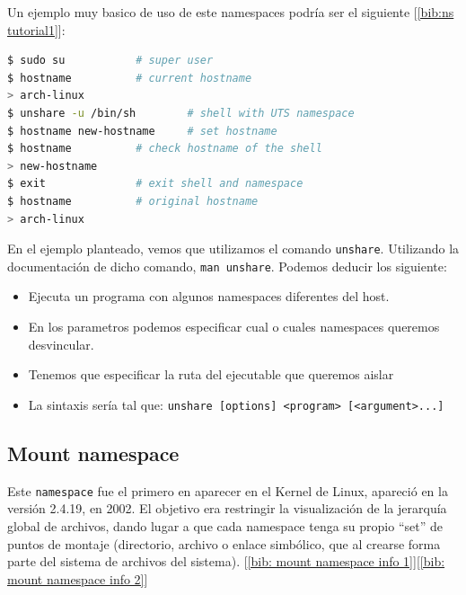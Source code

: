 \documentclass[12pt]{article}
\begin{document}
	\par \noindent Un ejemplo muy basico de uso de este namespaces podría ser el siguiente [\ref{bib:ns tutorial1}]:\\
	\begin{lstlisting}[language=bash, caption=Ejemplo de uso de UTS namespace]
$ sudo su			# super user
$ hostname			# current hostname
> arch-linux					
$ unshare -u /bin/sh		# shell with UTS namespace
$ hostname new-hostname		# set hostname
$ hostname			# check hostname of the shell
> new-hostname
$ exit				# exit shell and namespace
$ hostname			# original hostname
> arch-linux
	\end{lstlisting}

	\addvspace{10px}

	\par \noindent En el ejemplo planteado, vemos que utilizamos el comando \texttt{unshare}. Utilizando la documentación de dicho comando, \texttt{man unshare}. Podemos deducir los siguiente:
	\begin{itemize}
		\item Ejecuta un programa con algunos namespaces diferentes del host.
		\item En los parametros podemos especificar cual o cuales namespaces queremos desvincular.
		\item Tenemos que especificar la ruta del ejecutable que queremos aislar
		\item La sintaxis sería tal que: \texttt{unshare [options] <program> [<argument>...]}
	\end{itemize}
	
	\pagebreak
	
	\subsection{Mount namespace}
	\noindent Este \texttt{namespace} fue el primero en aparecer en el Kernel de Linux, apareció en la versión 2.4.19, en 2002. El objetivo era restringir la visualización de la jerarquía global de archivos, dando lugar a que cada namespace tenga su propio ``set'' de puntos de montaje (directorio, archivo o enlace simbólico, que al crearse forma parte del sistema de archivos del sistema). [\ref{bib: mount namespace info 1}][\ref{bib: mount namespace info 2}] \\
	
\end{document}
